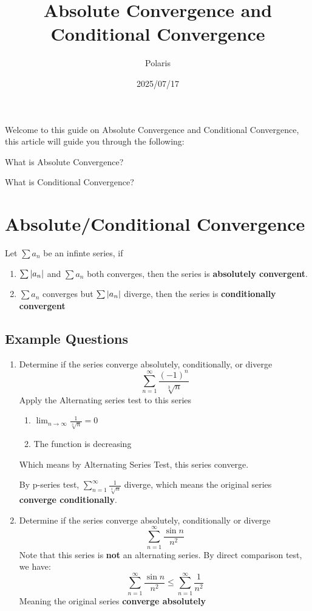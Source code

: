 \documentclass{article}
\title{Absolute Convergence and Conditional Convergence}
\author{Polaris}
\date{2025/07/17}
\numberwithin{equation}{section}
\begin{document}
\maketitle

Welcome to this guide on Absolute Convergence and Conditional Convergence, this article will guide you through the following:

What is Absolute Convergence?

What is Conditional Convergence?

\section{Absolute/Conditional Convergence}
Let $\sum a_n$ be an infinte series, if 
\begin{enumerate}
    \item $\sum \abs{a_n}$ and $\sum a_n$ both converges, then the series is \textbf{absolutely convergent}.
    \item $\sum a_n$ converges but $\sum \abs{a_n}$ diverge, then the series is \textbf{conditionally convergent}
\end{enumerate}

\subsection{Example Questions}
\begin{enumerate}
    \item Determine if the series converge absolutely, conditionally, or diverge
    \[
    \sum_{n = 1}^{\infty} \frac{(-1)^n}{\sqrt[3]{n}}
    \]
    Apply the Alternating series test to this series
    \begin{enumerate}
        \item $\displaystyle \lim_{n\to\infty}\frac{1}{\sqrt[3]{n}} = 0$
        \item The function is decreasing
    \end{enumerate}
    Which means by Alternating Series Test, this series converge. 
    
    By p-series test, $\displaystyle \sum_{n=1}^{\infty}  \frac{1}{\sqrt[3]{n}}$ diverge, which means the original series \textbf{converge conditionally}.

    \item Determine if the series converge absolutely, conditionally or diverge
    \[
    \sum_{n = 1}^{\infty} \frac{\sin n}{n^2}
    \]
    Note that this series is \textbf{not} an alternating series. By direct comparison test, we have:
    \[
        \sum_{n = 1}^{\infty} \frac{\sin n}{n^2} \leq \sum_{n = 1}^{\infty} \frac{1}{n^2}
    \]
    Meaning the original series \textbf{converge absolutely}
\end{enumerate}
\end{document}
